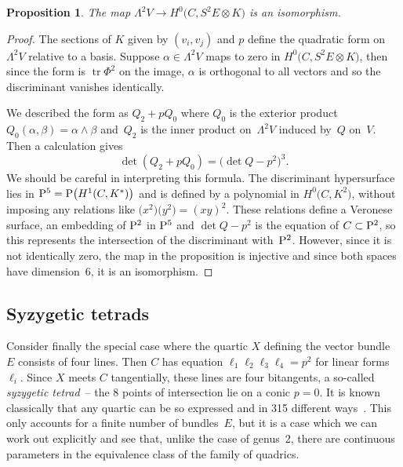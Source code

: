 \documentclass[pdftex]{sigma}
\numberwithin{equation}{section}
\newtheorem{Proposition}[Theorem]{Proposition}
 { \theoremstyle{definition}
\newtheorem{Remark}[Theorem]{Remark} }
\begin{document}
\begin{Proposition} The map $\Lambda^2V\rightarrow H^0\big(C, S^2E\otimes K\big)$ is an isomorphism.
\end{Proposition}
\begin{proof} The sections of $K$ given by $(v_i,v_j)$ and $p$ define the quadratic form on $\Lambda^2V$ relative to a basis. Suppose $\alpha\in \Lambda^2V$ maps to zero
in $H^0\big(C, S^2E\otimes K\big)$, then since the form is $\operatorname{tr} \Phi^2$ on the image, $\alpha$ is orthogonal to all vectors and so the discriminant vanishes identically.

We described the form as $Q_2+pQ_0$ where $Q_0$ is the exterior product $Q_0(\alpha,\beta)=\alpha\wedge\beta$ and~$Q_2$ is the inner product on~$\Lambda^2V$ induced by~$Q$ on~$V$. Then a calculation gives
\begin{equation*}
\det (Q_2+pQ_0)=\big(\det Q-p^2\big)^3.
\end{equation*}
We should be careful in interpreting this formula. The discriminant hypersurface lies in $\mathrm{P}^5={\rm P}\big(H^1(C,K^{*})\big)$ and is defined by a polynomial in $H^0\big(C,K^2\big)$, without imposing any relations like $\big(x^2\big)\big(y^2\big)=(xy)^2$. These relations define a Veronese surface, an embedding of ${\rm P}^2$ in ${\rm P}^5$ and $\det Q-p^2$ is the equation of $C\subset {\rm P}^2$, so this represents the intersection of the discriminant with~${\rm P}^2$. However, since it is not identically zero, the map in the proposition is injective and since both spaces have dimension~$6$, it is an isomorphism.
\end{proof}

 \subsection{Syzygetic tetrads}
 Consider finally the special case where the quartic $X$ defining the vector bundle $E$ consists of four lines. Then $C$ has equation $\ell_1\ell_2\ell_3\ell_4=p^2$ for linear forms $\ell_i$. Since $X$ meets $C$ tangentially, these lines are four bitangents, a so-called {\it syzygetic tetrad}~-- the 8 points of intersection lie on a conic $p=0$.
 It is known classically that any quartic can be so expressed and in 315 different ways~\cite{Dolgachev}. This only accounts for a finite number of bundles~$E$, but it is a case which we can work out explicitly and see that, unlike the case of genus~2, there are continuous parameters in the equivalence class of the family of quadrics.
\end{document}
